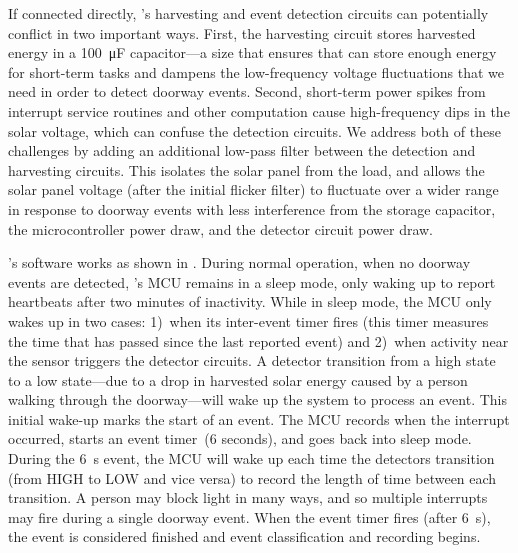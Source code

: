 If connected directly, \sysname's harvesting and event detection circuits can potentially conflict in two important ways.
First, the harvesting circuit stores harvested energy in a \SI{100}{\micro\farad} capacitor---a size that ensures that \sysname can store enough energy for short-term tasks and dampens the low-frequency voltage fluctuations that we need in order to detect doorway events.
Second, short-term power spikes from interrupt service routines and other computation cause high-frequency dips in the solar voltage, which can confuse the detection circuits.
We address both of these challenges by adding an additional low-pass filter between the detection and harvesting circuits. This isolates the solar panel from the load, and allows the solar panel voltage (after the initial flicker filter) to fluctuate over a wider range in response to doorway events with less interference from the storage capacitor, the microcontroller power draw, and the detector circuit power draw. 

\sysname's software works as shown in . 
During normal operation, when no doorway events are detected, \sysname's MCU remains in a sleep mode, only waking up to report heartbeats after two minutes of inactivity.
While in sleep mode, the MCU only wakes up in two cases: 1)~when its inter-event timer fires (this timer measures the time that has passed since the last reported event) and 2)~when activity near the sensor triggers the detector circuits.
A detector transition from a high state to a low state---due to a drop in harvested solar energy caused by a person walking through the doorway---will wake up the system to process an event.
This initial wake-up marks the start of an event.
The MCU records when the interrupt occurred, starts an event timer~(6 seconds), and goes back into sleep mode.
During the \SI{6}{\second} event, the MCU will wake up each time the detectors transition (from HIGH to LOW and vice versa) to record the length of time between each transition.
A person may block light in many ways, and so multiple interrupts may fire during a single doorway event.
When the event timer fires (after \SI{6}{\second}), the event is considered finished and event classification and recording begins.

